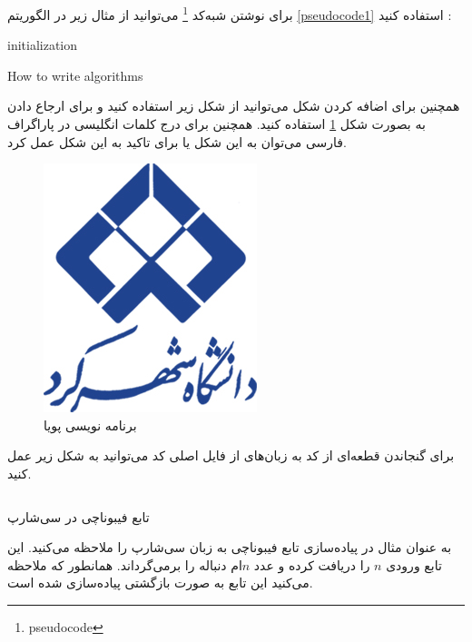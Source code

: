 برای نوشتن شبه‌کد
 \footnote{pseudocode}
 می‌توانید از مثال زیر در الگوریتم
  \ref{pseudocode1}
   استفاده کنید :

\begin{latin}
\begin{algorithm}[H]
    initialization\;
    \label{pseudocode1}
    \caption{How to write algorithms}
\end{algorithm}
\end{latin}

همچنین برای اضافه کردن شکل می‌توانید از شکل زیر استفاده کنید و برای ارجاع دادن به بصورت شکل
 \ref{fig:dynamicprogramming}
 استفاده کنید.
 همچنین برای درج کلمات انگلیسی در پاراگراف فارسی می‌توان به این شکل
 یا برای تاکید به این شکل
 عمل کرد.
\begin{figure}[H]
    \centering
    \includegraphics[width=0.4\linewidth]{images/SKU_logo_color.jpg}
    \caption{برنامه نویسی پویا}
    \label{fig:dynamicprogramming}
\end{figure}

برای گنجاندن قطعه‌ای از کد به زبان‌های 
از فایل اصلی کد می‌توانید به شکل زیر عمل کنید.
 
\begin{program}[H]
    \inputminted[frame=none]{csharp}{Sample.cs}
    \caption{تابع فیبوناچی در سی‌شارپ}
    \label{csharpfib}
\end{program}

به عنوان مثال در 
پیاده‌سازی تابع فیبوناچی به زبان سی‌شارپ را ملاحظه می‌کنید. این تابع ورودی $n$ را دریافت کرده و عدد $n$ام دنباله را برمی‌گرداند. همانطور که ملاحظه می‌کنید این تابع به صورت بازگشتی پیاده‌سازی شده است.

